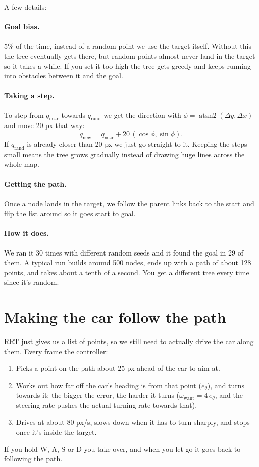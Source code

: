 \documentclass[11pt]{article}
\begin{document}
A few details:

\paragraph{Goal bias.} 5\% of the time, instead of a random point we use the target itself. Without this
the tree eventually gets there, but random points almost never land in the target so it takes a while.
If you set it too high the tree gets greedy and keeps running into obstacles between it and the goal.

\paragraph{Taking a step.} To step from $q_{\text{near}}$ towards $q_{\text{rand}}$ we get the direction
with $\phi = \operatorname{atan2}(\Delta y, \Delta x)$ and move 20 px that way:
\[
  q_{\text{new}} = q_{\text{near}} + 20\,(\cos\phi, \sin\phi).
\]
If $q_{\text{rand}}$ is already closer than 20 px we just go straight to it. Keeping the steps small means
the tree grows gradually instead of drawing huge lines across the whole map.

\paragraph{Getting the path.} Once a node lands in the target, we follow the parent links back to the
start and flip the list around so it goes start to goal.

\paragraph{How it does.} We ran it 30 times with different random seeds and it found the goal in 29 of
them. A typical run builds around 500 nodes, ends up with a path of about 128 points, and takes about a
tenth of a second. You get a different tree every time since it's random.

\section{Making the car follow the path}

RRT just gives us a list of points, so we still need to actually drive the car along them. Every frame
the controller:
\begin{enumerate}
  \item Picks a point on the path about 25 px ahead of the car to aim at.
  \item Works out how far off the car's heading is from that point ($e_\theta$), and turns towards it:
    the bigger the error, the harder it turns ($\omega_{\text{want}} = 4\,e_\theta$, and the steering rate
    pushes the actual turning rate towards that).
  \item Drives at about 80 px/s, slows down when it has to turn sharply, and stops once it's inside the
    target.
\end{enumerate}
If you hold W, A, S or D you take over, and when you let go it goes back to following the path.
\end{document}
